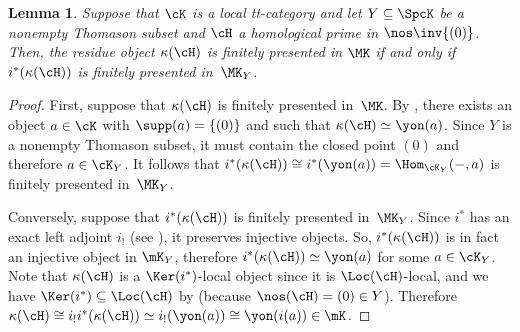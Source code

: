 \documentclass[11pt]{amsart}
\numberwithin{equation}{section} %
\theoremstyle{plain}
\newtheorem{lem}[equation]{Lemma}
\theoremstyle{definition}
\theoremstyle{remark}
\begin{document}
%
\begin{lem}
\label{lem:resreg-in-K_Y}
    Suppose that $\cK$ is a local tt-category and let $Y\subseteq \SpcK$ be a nonempty Thomason subset and $\cH$ a homological prime in $\nos \inv \{(0) \}$. Then, the residue object $\kappa(\cH)$ is finitely presented in $\MK$ if and only if $i^{\ast}(\kappa(\cH))$ is finitely presented in~$\MK_Y$.
\end{lem}
\begin{proof}
    First, suppose that $\kappa(\cH)$ is finitely presented in~$\MK$. By , there exists an object $a \in \cK$ with $\supp(a) = \{ (0)\}$ and such that $\kappa(\cH) \simeq \yon(a)$. Since $Y$ is a nonempty Thomason subset, it must contain the closed point $(0)$ and therefore $a \in \cK_Y$. It follows that $i^{\ast} (\kappa(\cH) )\cong i^{\ast}(\yon(a)) = \Hom_{\cK_Y}(-, a)$ is finitely presented in~$\MK_Y$. 

Conversely, suppose that $i^{\ast}(\kappa(\cH))$ is finitely presented in~$\MK_Y$. 
Since $i^{\ast}$ has an exact left adjoint $i_!$ (see ), it preserves injective objects. 
So, $i^{\ast}(\kappa(\cH))$ is in fact an injective object in $\mK_Y$, therefore $i^*(\kappa(\cH))\simeq\yon(a)$ for some $a\in\cK_Y$. 
Note that $\kappa(\cH)$ is a $\Ker(i^{\ast})$-local object since it is $\Loc(\cH)$-local, and we have $\Ker(i^{\ast}) \subseteq \Loc(\cH)$ by  (because $\nos(\cH) =(0) \in Y$). Therefore $\kappa(\cH)\cong i_!i^*(\kappa(\cH))\simeq i_!(\yon(a))\cong\yon(i(a))\in\mK$.
\end{proof}
\end{document}
